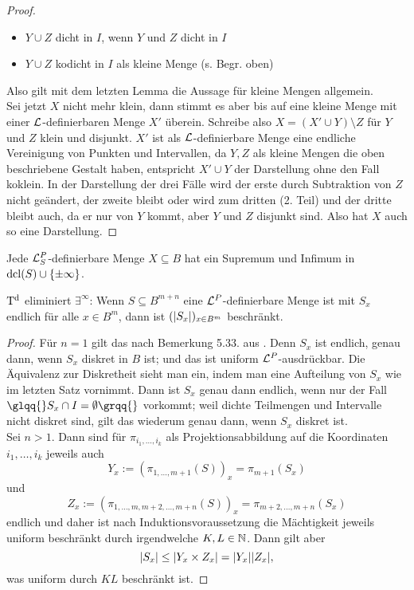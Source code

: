 \begin{proof}
\begin{itemize}
		\item $Y\cup Z$ dicht in $I$, wenn $Y$ und $Z$ dicht in $I$
		\item $Y\cup Z$ kodicht in $I$ als kleine Menge (s. Begr. oben)
	\end{itemize}
    Also gilt mit dem letzten Lemma die Aussage für kleine Mengen allgemein.\\
	Sei jetzt $X$ nicht mehr klein, dann stimmt es aber bis auf eine kleine Menge mit einer $\mathcal{L}$-definierbaren Menge $X'$ überein. Schreibe also $X=(X'\cup Y)\setminus Z$ für $Y$ und $Z$ klein und disjunkt. $X'$ ist als $\mathcal{L}$-definierbare Menge eine endliche Vereinigung von Punkten und Intervallen, da $Y,Z$  als kleine Mengen die oben beschriebene Gestalt haben, entspricht $X'\cup Y$ der Darstellung ohne den Fall koklein. In der Darstellung der drei Fälle wird der erste durch Subtraktion von $Z$ nicht geändert, der zweite bleibt oder wird zum dritten (2. Teil) und der dritte bleibt auch, da er nur von $Y$ kommt, aber $Y$ und $Z$ disjunkt sind. Also hat $X$ auch so eine Darstellung.
\end{proof}

\begin{corollary}
	Jede $\mathcal{L}^P_S$-definierbare Menge $X\subseteq B$ hat ein Supremum und Infimum in $\operatorname{dcl}(S)\cup\{\pm\infty\}$.
\end{corollary}

\begin{lemma}
	$\operatorname{T^d}$ eliminiert $\exists^\infty$: Wenn $S\subseteq B^{m+n}$ eine $\mathcal{L}^P$-definierbare Menge ist mit $S_x$ endlich für alle $x\in B^m$, dann ist $({\left| S_x \right|})_{x\in B^m}$ beschränkt.
\end{lemma}
\begin{proof}
	Für $n=1$ gilt das nach Bemerkung 5.33. aus \cite{Lukas}. Denn $S_x$ ist endlich, genau dann, wenn $S_x$ diskret in $B$ ist; und das ist uniform $\mathcal{L}^P$-ausdrückbar. Die Äquivalenz zur Diskretheit sieht man ein, indem man eine Aufteilung von $S_x$ wie im letzten Satz vornimmt. Dann ist $S_x$ genau dann endlich, wenn nur der Fall $\glqq{}S_x\cap I=\emptyset\grqq{}$ vorkommt; weil dichte Teilmengen und Intervalle nicht diskret sind, gilt das wiederum genau dann, wenn $S_x$ diskret ist.\\
	Sei $n>1$. Dann sind für $\pi_{i_1,\dots,i_k}$ als Projektionsabbildung auf die Koordinaten $i_1,\dots,i_k$ jeweils auch $$Y_x:=(\pi_{1,\dots,m+1}(S))_x=\pi_{m+1}(S_x)$$ und $$Z_x:=(\pi_{1,\dots,m,m+2,\dots,m+n}(S))_x=\pi_{m+2,\dots,m+n}(S_x)$$ endlich und daher ist nach Induktionsvoraussetzung die Mächtigkeit jeweils uniform beschränkt durch irgendwelche $K,L\in\mathbb{N}$. Dann gilt aber $${\left| S_x \right|}\leq {\left| Y_x\times Z_x \right|}={\left| Y_x \right|}{\left| Z_x \right|},$$ was uniform durch $KL$ beschränkt ist.
\end{proof}

